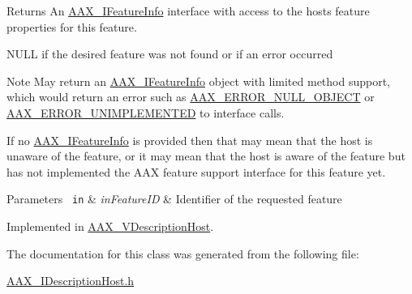 \begin{DoxyReturn}{Returns}
An \mbox{\hyperlink{a01829}{A\+A\+X\+\_\+\+I\+Feature\+Info}} interface with access to the host\textquotesingle{}s feature properties for this feature. 

{\ttfamily N\+U\+LL} if the desired feature was not found or if an error occurred
\end{DoxyReturn}
\begin{DoxyNote}{Note}
May return an \mbox{\hyperlink{a01829}{A\+A\+X\+\_\+\+I\+Feature\+Info}} object with limited method support, which would return an error such as \mbox{\hyperlink{a00494_a5f8c7439f3a706c4f8315a9609811937a647cce13fa531e3a46c6eab694048a9c}{A\+A\+X\+\_\+\+E\+R\+R\+O\+R\+\_\+\+N\+U\+L\+L\+\_\+\+O\+B\+J\+E\+CT}} or \mbox{\hyperlink{a00494_a5f8c7439f3a706c4f8315a9609811937a3b76994b32b97fcd56b19ef8032245df}{A\+A\+X\+\_\+\+E\+R\+R\+O\+R\+\_\+\+U\+N\+I\+M\+P\+L\+E\+M\+E\+N\+T\+ED}} to interface calls.

If no \mbox{\hyperlink{a01829}{A\+A\+X\+\_\+\+I\+Feature\+Info}} is provided then that may mean that the host is unaware of the feature, or it may mean that the host is aware of the feature but has not implemented the A\+AX feature support interface for this feature yet.
\end{DoxyNote}

\begin{DoxyParams}[1]{Parameters}
\mbox{\texttt{ in}}  & {\em in\+Feature\+ID} & Identifier of the requested feature \\
\hline
\end{DoxyParams}


Implemented in \mbox{\hyperlink{a01909_a60edaf5e2fff55315bc0c3ecb9a86118}{A\+A\+X\+\_\+\+V\+Description\+Host}}.



The documentation for this class was generated from the following file\+:\begin{DoxyCompactItemize}
\item 
\mbox{\hyperlink{a00578}{A\+A\+X\+\_\+\+I\+Description\+Host.\+h}}\end{DoxyCompactItemize}

